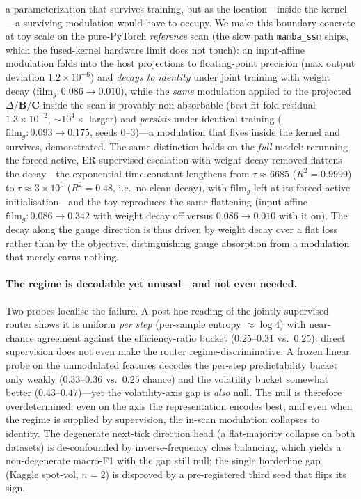 \documentclass{article}
\begin{document}
a parameterization that survives training, but as the location---inside the
kernel---a surviving modulation would have to occupy.  We make this boundary
concrete at toy scale on the pure-PyTorch \emph{reference} scan (the slow path
\texttt{mamba\_ssm} ships, which the fused-kernel hardware limit does not touch):
an input-affine modulation folds into the host projections to floating-point
precision (max output deviation $1.2{\times}10^{-6}$) and \emph{decays to identity}
under joint training with weight decay ($\mathrm{film}_g\!:0.086\!\to\!0.010$),
while the \emph{same} modulation applied to the projected $\Delta/\mathbf{B}/
\mathbf{C}$ inside the scan is provably non-absorbable (best-fit fold residual
$1.3{\times}10^{-2}$, ${\sim}10^{4}{\times}$ larger) and \emph{persists} under
identical training ($\mathrm{film}_g\!:0.093\!\to\!0.175$, seeds 0--3)---a
modulation that lives inside the kernel and survives, demonstrated.  The same
distinction holds on the \emph{full} model: rerunning the forced-active,
ER-supervised escalation with weight decay removed flattens the decay---the
exponential time-constant lengthens from $\tau\approx6685$ ($R^2=0.9999$) to
$\tau\approx3{\times}10^{5}$ ($R^2=0.48$, i.e.\ no clean decay), with
$\mathrm{film}_g$ left at its forced-active initialisation---and the toy
reproduces the same flattening (input-affine $\mathrm{film}_g\!:0.086\!\to\!0.342$
with weight decay off versus $0.086\!\to\!0.010$ with it on).  The decay along the
gauge direction is thus driven by weight decay over a flat loss rather than by the
objective, distinguishing gauge absorption from a modulation that merely earns
nothing.

\paragraph{The regime is decodable yet unused---and not even needed.}
Two probes localise the failure. A post-hoc reading of the jointly-supervised router
shows it is uniform \emph{per step} (per-sample entropy $\approx \log 4$) with near-chance
agreement against the efficiency-ratio bucket ($0.25$--$0.31$ vs.\ $0.25$): direct
supervision does not even make the router regime-discriminative. A frozen linear probe on
the unmodulated features decodes the per-step predictability bucket only weakly
($0.33$--$0.36$ vs.\ $0.25$ chance) and the volatility bucket somewhat better
($0.43$--$0.47$)---yet the volatility-axis gap is \emph{also} null. The null is therefore
overdetermined: even on the axis the representation encodes best, and even when the regime
is supplied by supervision, the in-scan modulation collapses to identity. The degenerate
next-tick direction head (a flat-majority collapse on both datasets) is de-confounded by
inverse-frequency class balancing, which yields a non-degenerate macro-F1 with the gap
still null; the single borderline gap (Kaggle spot-vol, $n{=}2$) is disproved by a
pre-registered third seed that flips its sign.
\end{document}
